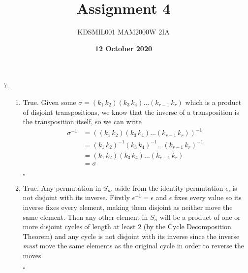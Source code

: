 \documentclass[12pt]{article}
\title{Assignment 4}
\author{KDSMIL001 \; MAM2000W 2IA}
\date{\textbf{12 October 2020}}
\numberwithin{equation}{section}
\numberwithin{figure}{section}
\begin{document}
    \maketitle
    \begin{enumerate}
        \setcounter{enumi}{6}
        \item \begin{enumerate}
            \item True. Given some $\sigma=(k_1\, k_2)(k_3\, k_4)\dots(k_{r-1}\, k_r)$ which is a product of disjoint transpositions, 
            we know that the inverse of a transposition is the transposition itself, so we can write
            \begin{align*}
                \sigma^{-1}&=((k_1\, k_2)(k_3\, k_4)\dots(k_{r-1}\, k_r))^{-1}\\
                &=(k_1\, k_2)^{-1}(k_3\, k_4)^{-1}\dots(k_{r-1}\, k_r)^{-1}\\
                &=(k_1\, k_2)(k_3\, k_4)\dots(k_{r-1}\, k_r)\\
                &=\sigma
            \end{align*}
            \newline
            \begin{flushright}$\square$\end{flushright}
            \item True. Any permutation in $S_n$, aside from the identity permutation $\epsilon$, is not disjoint with its inverse. Firstly $\epsilon^{-1}=\epsilon$ 
            and $\epsilon$ fixes every value so its inverse fixes every element, making them disjoint as neither move the same element. Then any other element in $S_n$ 
            will be a product of one or more disjoint cycles of length at least 2 (by the Cycle Decomposition Theorem) and any cycle is not disjoint with its inverse since 
            the inverse \textit{must} move the same elements as the original cycle in order to reverse the moves.
            \newline
            \begin{flushright}$\square$\end{flushright}
        \end{enumerate}
    \end{enumerate}
\end{document}
